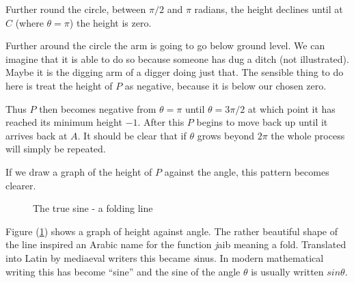 \documentclass[main.tex]{subfiles}
\begin{document}
Further round the circle, between $\pi/2$ and $\pi$ radians, the height declines until at $C$ (where $\theta=\pi$) the height is zero.

Further around the circle the arm is going to go below ground level. We can imagine that it is able to do so because someone has dug a ditch (not illustrated). Maybe it is the digging arm of a digger doing just that. The sensible thing to do here is treat the height of $P$ as negative, because it is below our chosen zero. 

Thus $P$ then becomes negative from $\theta=\pi$ until $\theta=3\pi/2$ at which point it has reached its minimum height $-1$. After this $P$ begins to move back up until it arrives back at $A$. It should be clear that if $\theta$ grows beyond $2\pi$ the whole process will simply be repeated.

If we draw a graph of the height of $P$ against the angle, this pattern becomes clearer.

\begin{figure}[H]
  \label{fig:sinegraph1}
  \caption{The true sine - a folding line}
  
\end{figure}

Figure (\ref{fig:sinegraph1}) shows a graph of height against angle. The rather beautiful shape of the line inspired an Arabic name for the function {\emph jaib} meaning a fold. Translated into Latin by mediaeval writers this became {\emph sinus}. In modern mathematical writing this has become ``sine'' and the sine of the angle $\theta$ is usually written $sin \theta$.
\end{document}
